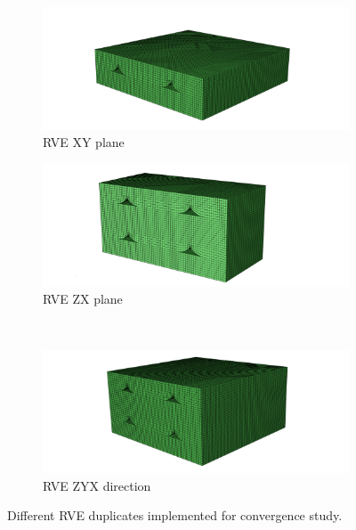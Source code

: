 \begin{figure}
\centering
  \begin{subfigure}[b]{0.48\textwidth}
    \includegraphics[width=\textwidth]{chapter_7_non-elasticmodelling/figures/RVEXY.png}
    \caption{ RVE XY plane}
  \end{subfigure}
  \begin{subfigure}[b]{0.48\textwidth}
    \includegraphics[width=\textwidth]{chapter_7_non-elasticmodelling/figures/RVEZX.png}
    \caption{ RVE ZX plane}
  \end{subfigure}
  \\
    \begin{subfigure}[b]{0.48\textwidth}
    \includegraphics[width=\textwidth]{chapter_7_non-elasticmodelling/figures/RVEZYX.png}
    \caption{ RVE ZYX direction }
  \end{subfigure}
  
  \caption{Different RVE duplicates implemented for convergence study.}
  \label{fig:mulRVE}
\end{figure}

